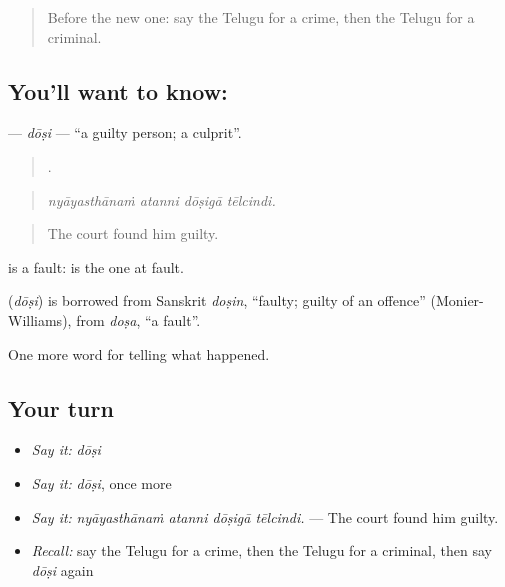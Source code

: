 \label{lesson:TE-C350-dosi}



\begin{quote}
Before the new one: say the Telugu for a crime, then the Telugu for a criminal.
\end{quote}

\subsection*{You'll want to know: }
\textbf{} — \emph{dōṣi} — \textquotedblleft{}a guilty person; a culprit\textquotedblright{}.

\begin{quote}
   .
\end{quote}

\begin{quote}
\emph{nyāyasthānaṁ atanni dōṣigā tēlcindi.}
\end{quote}

\begin{quote}
The court found him guilty.
\end{quote}

 is a fault:  is the one at fault.

\begin{cousinweb}
\textbf{} (\emph{dōṣi}) is borrowed from Sanskrit \emph{doṣin}, \textquotedblleft{}faulty; guilty of an offence\textquotedblright{} (Monier-Williams), from \emph{doṣa}, \textquotedblleft{}a fault\textquotedblright{}.
\end{cousinweb}

\begin{grammarlens}[title={What you've built}]
One more word for telling what happened.
\end{grammarlens}

\subsection*{Your turn}
\begin{itemize}
\raggedright
  \item \emph{Say it:} \emph{dōṣi}
  \item \emph{Say it:} \emph{dōṣi}, once more
  \item \emph{Say it:} \emph{nyāyasthānaṁ atanni dōṣigā tēlcindi.} — The court found him guilty.
  \item \emph{Recall:} say the Telugu for a crime, then the Telugu for a criminal, then say \emph{dōṣi} again
\end{itemize}

